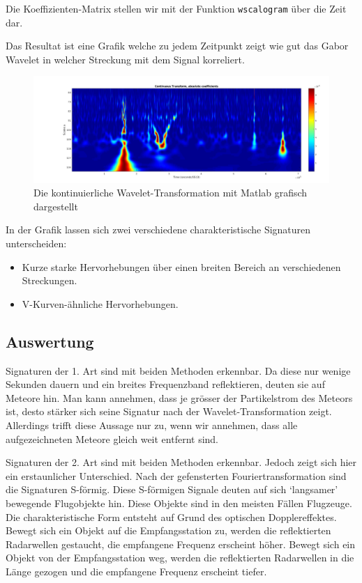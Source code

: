 \begin{refsection}
Die Koeffizienten-Matrix stellen wir mit der Funktion \texttt{wscalogram} über die Zeit dar.

Das Resultat ist eine Grafik welche zu jedem Zeitpunkt zeigt wie gut das Gabor Wavelet in welcher Streckung mit dem Signal korreliert. 

\begin{figure}
	\centering
	\includegraphics[width=\linewidth]{papers/meteor/images/signal_wscalo.png}
	\caption{Die kontinuierliche Wavelet-Transformation mit Matlab grafisch dargestellt}
	\label{fig:signalmitwscalo}
\end{figure}
In der Grafik lassen sich zwei verschiedene charakteristische Signaturen unterscheiden:
\begin{itemize}
	\item Kurze starke Hervorhebungen über einen breiten Bereich an verschiedenen Streckungen.
	\item V-Kurven-ähnliche  Hervorhebungen.
\end{itemize}

\subsection{Auswertung}
Signaturen der 1. Art sind mit beiden Methoden erkennbar.
Da diese nur wenige Sekunden dauern und ein breites Frequenzband reflektieren, deuten sie auf Meteore hin.
Man kann annehmen, dass je grösser der Partikelstrom des Meteors ist, desto stärker sich seine Signatur nach der Wavelet-Transformation zeigt.
Allerdings trifft diese Aussage nur zu, wenn wir annehmen, dass alle aufgezeichneten Meteore gleich weit entfernt sind.

Signaturen der 2. Art sind mit beiden Methoden erkennbar.
Jedoch zeigt sich hier ein erstaunlicher Unterschied.
Nach der gefensterten Fouriertransformation sind die Signaturen S-förmig.
Diese S-förmigen Signale deuten auf sich `langsamer' bewegende Flugobjekte hin.
Diese Objekte sind in den meisten Fällen Flugzeuge.
%
Die charakteristische Form entsteht auf Grund des optischen Dopplereffektes. 
%
Bewegt sich ein Objekt auf die Empfangsstation zu, werden die reflektierten Radarwellen gestaucht, die empfangene Frequenz erscheint höher.
Bewegt sich ein Objekt von der Empfangsstation weg, werden die reflektierten Radarwellen in die Länge gezogen und die empfangene Frequenz erscheint tiefer.


\end{refsection}
